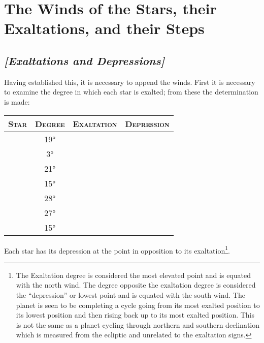 \section{The Winds of the Stars, their Exaltations, and their Steps}
\subsection{\textit{[Exaltations and Depressions]}}
Having established this, it is necessary to append the winds. First it is necessary to examine the  degree in which each star is exalted; from these the determination is made:

\begin{center}
\begin{tabular}{cccc}
\textsc{Star} & \textsc{Degree} 
	& \textsc{Exaltation} & \textsc{Depression} \\
\toprule
\Sun 		& 19°		& \Aries 			& \Libra			\\
\Moon		&   3° 		& \Taurus			& \Scorpio  		\\
\Saturn		& 21°		& \Libra			& \Aries			\\
\Jupiter		& 15°		& \Cancer			& \Capricorn		\\
\Mars		& 28°		& \Capricorn		& \Cancer 		\\
\Venus		& 27°		& \Pisces			& \Virgo 			\\
\Mercury	& 15°		& \Virgo			& \Pisces			\\
\bottomrule
\end{tabular}
\end{center}

Each star has its depression at the point in opposition to its exaltation\footnote{The Exaltation degree  is considered the most elevated point and is equated with the north wind. The degree opposite the exaltation degree is considered the ``depression'' or lowest point and is equated with the south wind. The planet is seen to be completing a cycle going from its most exalted position to its lowest position and then rising back up to its most exalted position. This is not the same as a planet cycling through northern and southern declination which is measured from the ecliptic and unrelated to the exaltation signs.}.

